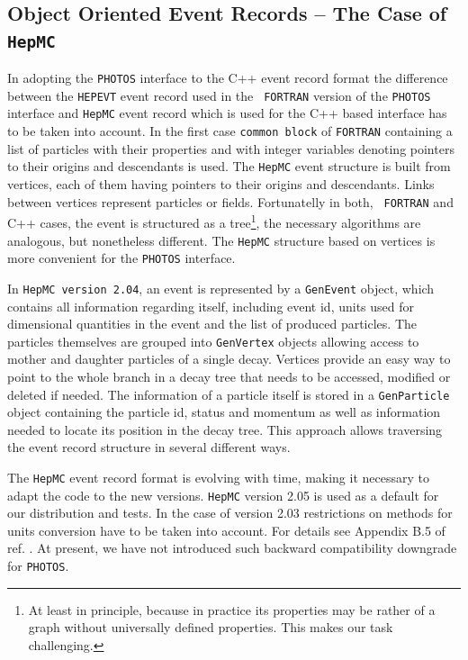 \documentclass[]{Photos_interface_design}
\begin{document}
\subsection{Object Oriented Event Records  -- The Case of {\tt HepMC}}
 In adopting the {\tt PHOTOS} interface to the C++ event record format
the difference between the {\tt HEPEVT} event record used in the {\tt
  FORTRAN} version of the {\tt PHOTOS} interface and {\tt HepMC} event
record which is used for the C++ based interface has to be taken into
account.  In the first case 
{\tt common block} of {\tt FORTRAN} containing a list of particles with their properties and
with integer variables denoting pointers to their origins and
descendants is used.  The {\tt HepMC} event structure is built from vertices,
each of them having pointers to their origins and descendants. Links
between vertices represent particles or fields.  Fortunatelly in both, {\tt
  FORTRAN} and C++ cases, the event is structured as a
tree\footnote{At least in principle, because in practice its
properties may be rather of a graph without universally defined
properties.  This makes our task challenging.}, the necessary
algorithms are analogous, but nonetheless different. The {\tt HepMC}
structure based on vertices is more convenient for the {\tt PHOTOS}
interface. 

In {\tt HepMC version 2.04}, an  event is represented by a {\tt GenEvent} object,
which contains all information regarding itself, including event id,
units used for dimensional quantities in the event and the list of produced particles. The particles
themselves are grouped into {\tt GenVertex} objects allowing access to mother
and daughter particles of a single decay. Vertices provide an easy way
to point to the whole branch in a decay tree that needs to be accessed,
modified or deleted if needed. The information of a particle  itself is stored
in a {\tt GenParticle} object containing the particle id, status and momentum
as well as information needed to locate its position in the decay tree.
This approach allows traversing the event record structure in several different
ways.

The {\tt HepMC} event record format is  evolving with time, making it necessary
 to adapt
the code to the new versions.
{\tt HepMC} version 2.05 is used as a default for our distribution and tests. 
In the case of version 2.03 restrictions on methods for 
units
conversion have to be taken into account. For details see Appendix B.5
of ref. \cite{Davidson:2010rw}. At present, we have not introduced such 
backward compatibility downgrade for {\tt PHOTOS}. 
\end{document}
